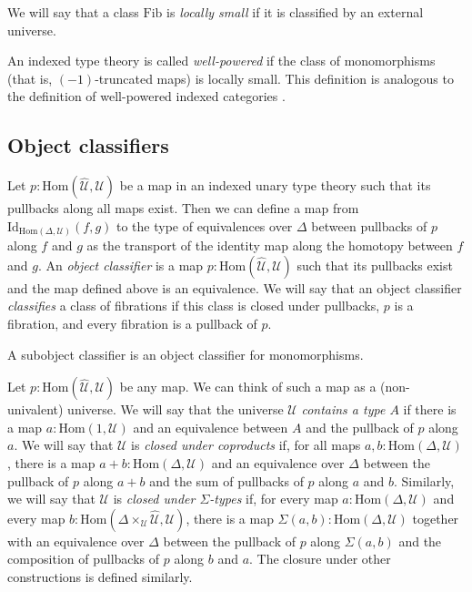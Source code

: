 \documentclass[reqno]{amsart}
\theoremstyle{definition}
\theoremstyle{remark}
\newcommand{\fs}[1]{\mathrm{#1}}
\newcommand{\Hom}{\fs{Hom}}
\newcommand{\Id}{\fs{Id}}
\newcommand{\Fib}{\fs{Fib}}
\numberwithin{figure}{section}
\begin{document}
\begin{defn}
We will say that a class $\Fib$ is \emph{locally small} if it is classified by an external universe.
\end{defn}

\begin{example}
An indexed type theory is called \emph{well-powered} if the class of monomorphisms (that is, $(-1)$-truncated maps) is locally small.
This definition is analogous to the definition of well-powered indexed categories \cite[Example~B1.3.14]{elephant}.
\end{example}

\subsection{Object classifiers}

Let $p : \Hom(\widehat{\mathcal{U}},\mathcal{U})$ be a map in an indexed unary type theory such that its pullbacks along all maps exist.
Then we can define a map from $\Id_{\Hom(\Delta,\mathcal{U})}(f,g)$ to the type of equivalences over $\Delta$ between pullbacks of $p$ along $f$ and $g$ as the transport of the identity map along the homotopy between $f$ and $g$.
An \emph{object classifier} is a map $p : \Hom(\widehat{\mathcal{U}},\mathcal{U})$ such that its pullbacks exist and the map defined above is an equivalence.
We will say that an object classifier \emph{classifies} a class of fibrations if this class is closed under pullbacks, $p$ is a fibration, and every fibration is a pullback of $p$.

\begin{example}
A subobject classifier is an object classifier for monomorphisms.
\end{example}

Let $p : \Hom(\widehat{\mathcal{U}},\mathcal{U})$ be any map.
We can think of such a map as a (non-univalent) universe.
We will say that the universe $\mathcal{U}$ \emph{contains a type $A$} if there is a map $a : \Hom(1,\mathcal{U})$ and an equivalence between $A$ and the pullback of $p$ along $a$.
We will say that $\mathcal{U}$ is \emph{closed under coproducts} if, for all maps $a,b : \Hom(\Delta,\mathcal{U})$, there is a map $a + b : \Hom(\Delta,\mathcal{U})$
and an equivalence over $\Delta$ between the pullback of $p$ along $a + b$ and the sum of pullbacks of $p$ along $a$ and $b$.
Similarly, we will say that $\mathcal{U}$ is \emph{closed under $\Sigma$-types} if, for every map $a : \Hom(\Delta,\mathcal{U})$
and every map $b : \Hom(\Delta \times_\mathcal{U} \widehat{\mathcal{U}}, \mathcal{U})$, there is a map $\Sigma(a,b) : \Hom(\Delta,\mathcal{U})$
together with an equivalence over $\Delta$ between the pullback of $p$ along $\Sigma(a,b)$ and the composition of pullbacks of $p$ along $b$ and $a$.
The closure under other constructions is defined similarly.
\end{document}
